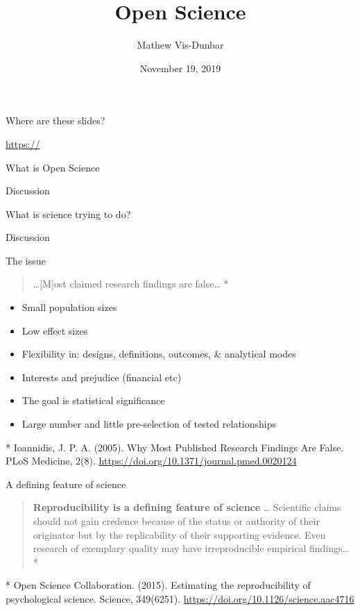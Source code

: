 \documentclass[
  ignorenonframetext,
]{beamer}
\title{Open Science}
\author{Mathew Vis-Dunbar}
\date{November 19, 2019}
\providecommand{\tightlist}{%
  \setlength{\itemsep}{0pt}\setlength{\parskip}{0pt}}
\begin{document}
\frame{\titlepage}

\begin{frame}{Where are these slides?}
\protect\hypertarget{where-are-these-slides}{}

\url{https://}

\end{frame}

\begin{frame}{What is Open Science}
\protect\hypertarget{what-is-open-science}{}

Discussion

\end{frame}

\begin{frame}{What is science trying to do?}
\protect\hypertarget{what-is-science-trying-to-do}{}

Discussion

\end{frame}

\begin{frame}{The issue}
\protect\hypertarget{the-issue}{}

\begin{quote}
\ldots{[}M{]}ost claimed research findings are false\ldots{} *
\end{quote}

\begin{itemize}[<+->]
\tightlist
\item
  Small population sizes
\item
  Low effect sizes
\item
  Flexibility in: designs, definitions, outcomes, \& analytical modes
\item
  Interests and prejudice (financial etc)
\item
  The goal is statistical significance
\item
  Large number and little pre-selection of tested relationships
\end{itemize}

{* Ioannidis, J. P. A. (2005). Why Most Published Research Findings Are
False. PLoS Medicine, 2(8).
\url{https://doi.org/10.1371/journal.pmed.0020124}}

\end{frame}

\begin{frame}{A defining feature of science}
\protect\hypertarget{a-defining-feature-of-science}{}

\begin{quote}
\textbf{Reproducibility is a defining feature of science} \ldots{}
Scientific claims should not gain credence because of the status or
authority of their originator but by the replicability of their
supporting evidence. Even research of exemplary quality may have
irreproducible empirical findings\ldots{} *
\end{quote}

{* Open Science Collaboration. (2015). Estimating the reproducibility of
psychological science. Science, 349(6251).
\url{https://doi.org/10.1126/science.aac4716}}

\end{frame}
\end{document}
